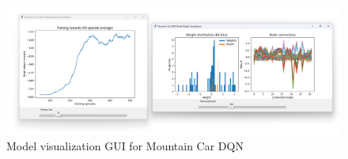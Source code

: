 \begin{figure}[H]
  \centering
  \includegraphics[width=1\textwidth]{figures/images/mountain_car_gui.png}
  \caption[Mountain Car DQN model visualization GUI]{Model visualization GUI for Mountain Car DQN}
  \label{fig:mountain_car_gui}
\end{figure}
